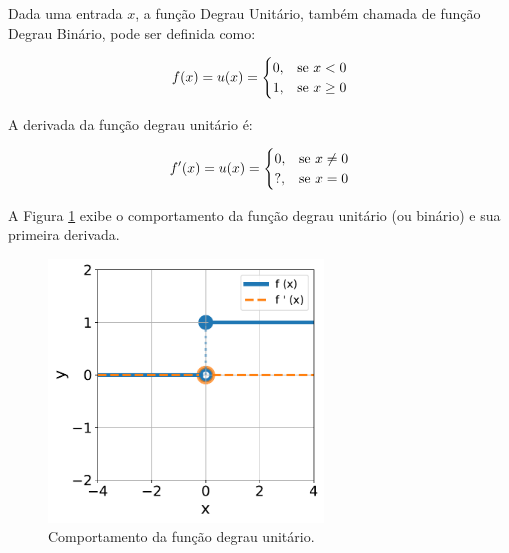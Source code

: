 \linebreak
\newpage


\begin{definition}
    Dada uma entrada $x$, a função Degrau Unitário, também chamada de função Degrau Binário, pode ser definida como:

    \begin{equation}
        f(x) = u(x) = 
        \begin{cases}
            0, & \text{se $x < 0$}\\
            1, & \text{se $x \geq 0$}
        \end{cases}
        \vspace{0.2cm}
        \label{eq:ann_step_function}
    \end{equation}

    A derivada da função degrau unitário é:

    \begin{equation}
        f'(x) = u(x) = 
        \begin{cases}
            0, & \text{se $x \neq 0$}\\
            \text{?}, & \text{se $x = 0$}
        \end{cases}
        \vspace{0.2cm}
        \label{eq:ann_step_function_dy}
    \end{equation}
    
\end{definition}

A Figura \ref{fig:ann_step_function} exibe o comportamento da função degrau unitário (ou binário) e sua primeira derivada.

\begin{figure}[H]
    \centering
    \includegraphics[width=0.65\textwidth]{figs/ann_unit_step_function.pdf}
    \caption{Comportamento da função degrau unitário.}
    \label{fig:ann_step_function}
\end{figure}


